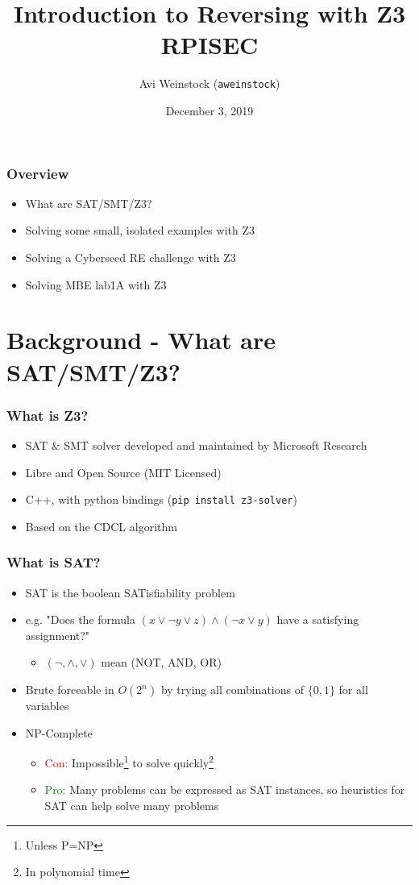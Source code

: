 \documentclass[aspectratio=169]{beamer}
\title{Introduction to Reversing with Z3\\RPISEC}
\date{December 3, 2019}
\author{Avi Weinstock (\Verb|aweinstock|)}
\begin{document}
\maketitle

\begin{frame}[fragile]
\frametitle{Overview}
\begin{itemize}
\item What are SAT/SMT/Z3?
\item Solving some small, isolated examples with Z3
\item Solving a Cyberseed RE challenge with Z3
\item Solving MBE lab1A with Z3
\end{itemize}
\end{frame}

\section{Background - What are SAT/SMT/Z3?}

\begin{frame}[fragile]
\frametitle{What is Z3?}
\begin{itemize}
\item SAT \& SMT solver developed and maintained by Microsoft Research
\item Libre and Open Source (MIT Licensed)
\item C++, with python bindings (\verb|pip install z3-solver|)
\item Based on the CDCL algorithm
\end{itemize}
\end{frame}

\begin{frame}[fragile]
\frametitle{What is SAT?}
\begin{itemize}
\item SAT is the boolean SATisfiability problem
\item e.g. "Does the formula $(x \lor \neg y \lor z) \land (\neg x \lor y)$ have a satisfying assignment?"
\begin{itemize}
\item $(\neg, \land, \lor)$ mean (NOT, AND, OR)
\end{itemize}
\item Brute forceable in $O(2^n)$ by trying all combinations of $\{0,1\}$ for all variables
\item NP-Complete 
\begin{itemize}
\item \textcolor{red}{Con:} Impossible\footnote{Unless P=NP} to solve quickly\footnote{In polynomial time}
\item \textcolor{green}{Pro:} Many problems can be expressed as SAT instances, so heuristics for SAT can help solve many problems
\end{itemize}
\end{itemize}
\end{frame}
\end{document}
